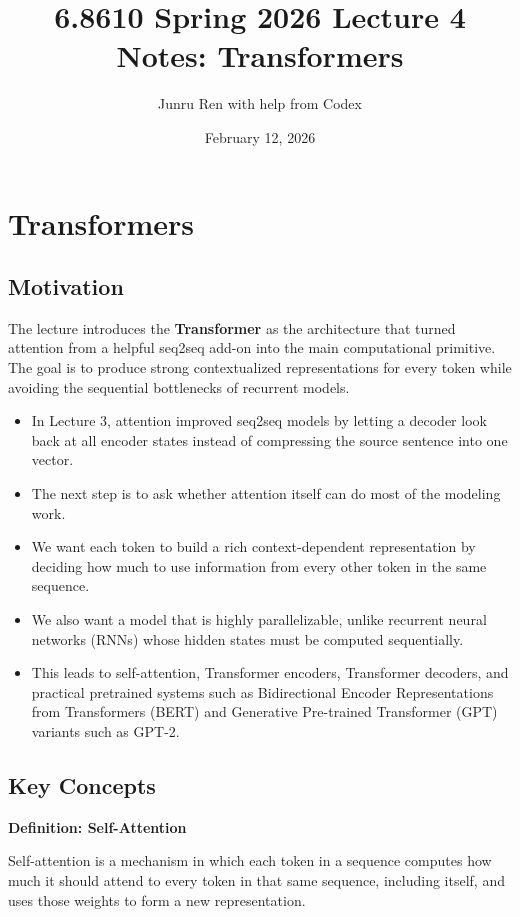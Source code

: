 \documentclass[11pt]{article}
\title{6.8610 Spring 2026 Lecture 4 Notes: Transformers}
\author{Junru Ren with help from Codex}
\date{February 12, 2026}
\begin{document}
\maketitle

\section{Transformers}

\subsection{Motivation}
The lecture introduces the \textbf{Transformer} as the architecture that turned attention from a helpful seq2seq add-on into the main computational primitive. The goal is to produce strong contextualized representations for every token while avoiding the sequential bottlenecks of recurrent models.

\begin{itemize}
    \item In Lecture 3, attention improved seq2seq models by letting a decoder look back at all encoder states instead of compressing the source sentence into one vector.
    \item The next step is to ask whether attention itself can do most of the modeling work.
    \item We want each token to build a rich context-dependent representation by deciding how much to use information from every other token in the same sequence.
    \item We also want a model that is highly parallelizable, unlike recurrent neural networks (RNNs) whose hidden states must be computed sequentially.
    \item This leads to self-attention, Transformer encoders, Transformer decoders, and practical pretrained systems such as Bidirectional Encoder Representations from Transformers (BERT) and Generative Pre-trained Transformer (GPT) variants such as GPT-2.
\end{itemize}

\subsection{Key Concepts}
\textbf{Definition: Self-Attention}

Self-attention is a mechanism in which each token in a sequence computes how much it should attend to every token in that same sequence, including itself, and uses those weights to form a new representation.
\end{document}
